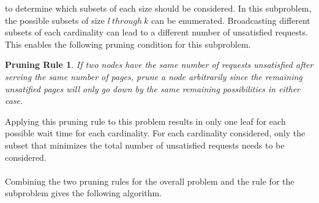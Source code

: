 \documentclass[12pt]{article}
\newtheorem*{prune}{Pruning Rule}
\begin{document}
to determine which subsets of each size should be considered.  In this 
subproblem, the possible subsets of size $l\ through\  k$ can be enumerated.
Broadcasting different subsets of each cardinality can lead to a different
number of unsatisfied requests.  This enables the following pruning condition
for this subproblem.
\begin{prune}
If two nodes have the same number of requests unsatisfied after serving
the same number of pages, prune a node arbitrarily since the remaining
unsatified pages will only go down by the same remaining possibilities
in either case.
\end{prune}
Applying this pruning rule to this problem results in only one leaf for
each possible wait time for each cardinality.  For each cardinality
considered, only the subset that minimizes the total number of unsatisfied 
requests needs to be considered.\\\\
Combining the two pruning rules for the overall problem and the rule
for the subproblem gives the following algorithm.\\\\
\begin{algorithm}[H]
\end{algorithm} 
\end{document}
